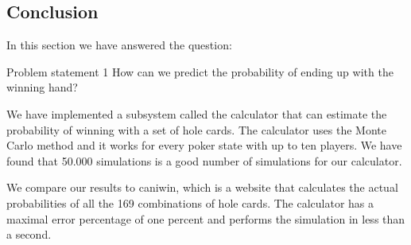 \subsection{Conclusion}
In this section we have answered the question:
\vspace{4mm}
\begin{statementBox2}{Problem statement 1}
How can we predict the probability of ending up with the winning hand?
\end{statementBox2}
\vspace{4mm}

We have implemented a subsystem called the calculator that can estimate the probability of winning with a set of hole cards. The calculator uses the Monte Carlo method and it works for every poker state with up to ten players. We have found that 50.000 simulations is a good number of simulations for our calculator. 

We compare our results to caniwin, which is a website that calculates the actual probabilities of all the 169 combinations of hole cards. The calculator has a maximal error percentage of one percent and performs the simulation in less than a second.